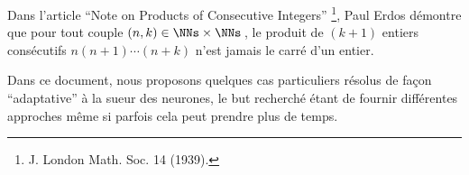 Dans l'article \enquote{Note on Products of Consecutive Integers}
\footnote{
	J. London Math. Soc. 14 (1939).
},
Paul Erdos démontre que pour tout couple $(n, k) \in \NNs \times \NNs$\,, le produit de $(k+1)$ entiers consécutifs $n (n + 1) \cdots (n + k)$ n'est jamais le carré d'un entier. 

\medskip

Dans ce document, nous proposons quelques cas particuliers résolus de façon \enquote{adaptative} à la sueur des neurones, le but recherché étant de fournir différentes approches même si parfois cela peut prendre plus de temps.

